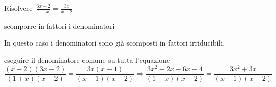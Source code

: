 \begin{exrig}
% 
% 
% 

 \begin{esempio}
Risolvere~$\frac{3x-2}{1+x}=\frac{3x}{x-2}$
 
\begin{enumerate*}
\item scomporre in fattori i denominatori

In questo caso i denominatori sono già scomposti in fattori irriducibili.

\item eseguire il denominatore comune su tutta l'equazione
\[\frac{(x-2)(3x-2)}{(1+x)(x-2)}=\frac{3x(x+1)}{(x+1)(x-2)}\Rightarrow
\frac{3x^{2}-2x-6x+4}{(1+x)(x-2)}=\frac{3x^2+3x}{(x+1)(x-2)}\]


\end{enumerate*}
\end{esempio}
\end{exrig}
